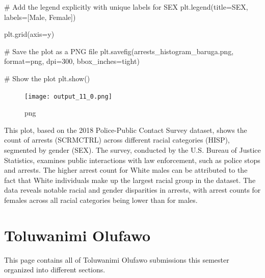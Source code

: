 \documentclass[
  letterpaper,
  DIV=11,
  numbers=noendperiod]{scrreprt}
\newenvironment{Shaded}{\begin{snugshade}}{\end{snugshade}}
\newcommand{\BuiltInTok}[1]{\textcolor[rgb]{0.00,0.23,0.31}{#1}}
\newcommand{\CommentTok}[1]{\textcolor[rgb]{0.37,0.37,0.37}{#1}}
\newcommand{\DecValTok}[1]{\textcolor[rgb]{0.68,0.00,0.00}{#1}}
\newcommand{\NormalTok}[1]{\textcolor[rgb]{0.00,0.23,0.31}{#1}}
\newcommand{\OperatorTok}[1]{\textcolor[rgb]{0.37,0.37,0.37}{#1}}
\newcommand{\StringTok}[1]{\textcolor[rgb]{0.13,0.47,0.30}{#1}}
\begin{document}
\begin{Shaded}
\begin{Highlighting}[]
\CommentTok{\# Add the legend explicitly with unique labels for SEX}
\NormalTok{plt.legend(title}\OperatorTok{=}\StringTok{\textquotesingle{}SEX\textquotesingle{}}\NormalTok{, labels}\OperatorTok{=}\NormalTok{[}\StringTok{\textquotesingle{}Male\textquotesingle{}}\NormalTok{, }\StringTok{\textquotesingle{}Female\textquotesingle{}}\NormalTok{])}

\NormalTok{plt.grid(axis}\OperatorTok{=}\StringTok{\textquotesingle{}y\textquotesingle{}}\NormalTok{)}

\CommentTok{\# Save the plot as a PNG file}
\NormalTok{plt.savefig(}\StringTok{\textquotesingle{}arrests\_histogram\_baruga.png\textquotesingle{}}\NormalTok{, }\BuiltInTok{format}\OperatorTok{=}\StringTok{\textquotesingle{}png\textquotesingle{}}\NormalTok{, dpi}\OperatorTok{=}\DecValTok{300}\NormalTok{, bbox\_inches}\OperatorTok{=}\StringTok{\textquotesingle{}tight\textquotesingle{}}\NormalTok{)}

\CommentTok{\# Show the plot}
\NormalTok{plt.show()}
\end{Highlighting}
\end{Shaded}

\begin{figure}[H]

{\centering \texttt{[image: output\_11\_0.png]}

}

\caption{png}

\end{figure}%

This plot, based on the 2018 Police-Public Contact Survey dataset, shows
the count of arrests (SCRMCTRL) across different racial categories
(HISP), segmented by gender (SEX). The survey, conducted by the U.S.
Bureau of Justice Statistics, examines public interactions with law
enforcement, such as police stops and arrests. The higher arrest count
for White males can be attributed to the fact that White individuals
make up the largest racial group in the dataset. The data reveals
notable racial and gender disparities in arrests, with arrest counts for
females across all racial categories being lower than for males.

\chapter{Toluwanimi Olufawo}\label{toluwanimi-olufawo}

This page contains all of Toluwanimi Olufawo submissions this semester
organized into different sections.
\end{document}

